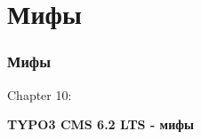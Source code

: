 %

\section{Мифы}
\begin{frame}[fragile]
	\frametitle{Мифы}

	\begin{center}\huge{Chapter 10:}\end{center}
	\begin{center}\huge{\color{typo3darkgrey}\textbf{TYPO3 CMS 6.2 LTS - мифы}}\end{center}

\end{frame}


